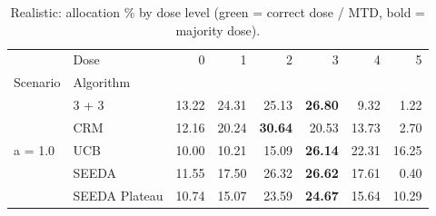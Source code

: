 \begin{table}[H]
\centering
\caption{Realistic: allocation \% by dose level (green = correct dose / MTD, bold = majority dose).}
\label{tab:real_alloc_by_dose}
\begin{tabular}{llrrrrrr}
\toprule
 & Dose & 0 & 1 & 2 & 3 & 4 & 5 \\
Scenario & Algorithm &  &  &  &  &  &  \\
\midrule
\multirow[c]{5}{*}{a = 1.0} & 3 + 3 & 13.22 & 24.31 & {\cellcolor[HTML]{C8E6C9}} 25.13 & \bfseries 26.80 & 9.32 & 1.22 \\
 & CRM & 12.16 & 20.24 & {\cellcolor[HTML]{C8E6C9}} \bfseries 30.64 & 20.53 & 13.73 & 2.70 \\
 & UCB & 10.00 & 10.21 & {\cellcolor[HTML]{C8E6C9}} 15.09 & \bfseries 26.14 & 22.31 & 16.25 \\
 & SEEDA & 11.55 & 17.50 & {\cellcolor[HTML]{C8E6C9}} 26.32 & \bfseries 26.62 & 17.61 & 0.40 \\
 & SEEDA Plateau & 10.74 & 15.07 & {\cellcolor[HTML]{C8E6C9}} 23.59 & \bfseries 24.67 & 15.64 & 10.29 \\
\bottomrule
\end{tabular}
\end{table}
